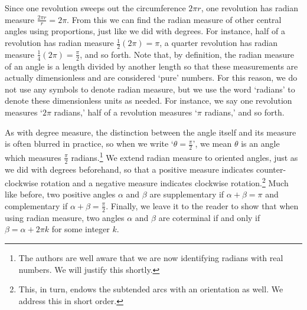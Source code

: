 Since one revolution sweeps out the circumference $2\pi r$, one revolution has radian measure $\frac{2 \pi r}{r} = 2 \pi$.  From this we can find the radian measure of other central angles using proportions, just like we did with degrees.    For instance, half of a revolution has radian measure  $\frac{1}{2} (2 \pi) = \pi$, a quarter revolution has radian measure $\frac{1}{4} (2 \pi) = \frac{\pi}{2}$, and so forth.   Note that, by definition, the radian measure of an angle is a length divided by another length so that these measurements are actually dimensionless and are considered `pure' numbers. For this reason, we do not use any symbols to denote radian measure, but we use the word `radians' to denote these dimensionless units as needed. For instance, we say one revolution measures `$2\pi$ radians,' half of a revolution measures `$\pi$ radians,' and so forth.  

\smallskip

As with degree measure, the distinction between the angle itself and its measure is often blurred in practice, so when we write  `$\theta = \frac{\pi}{2}$', we mean $\theta$ is an angle which measures $\frac{\pi}{2}$ radians.\footnote{The authors are well aware that we are now identifying radians with real numbers.  We will justify this shortly.} We extend radian measure to oriented angles, just as we did with degrees beforehand, so that a positive measure indicates counter-clockwise rotation and a negative measure indicates clockwise rotation.\footnote{This, in turn, endows the subtended arcs with an orientation as well.  We address this in short order.}  Much like before, two positive angles $\alpha$ and $\beta$ are supplementary if $\alpha + \beta = \pi$ and complementary if $\alpha + \beta = \frac{\pi}{2}$.   Finally, we leave it to the reader to show that when using radian measure, two angles $\alpha$ and $\beta$ are coterminal if and only if $\beta = \alpha + 2\pi k$ for some integer $k$. 

